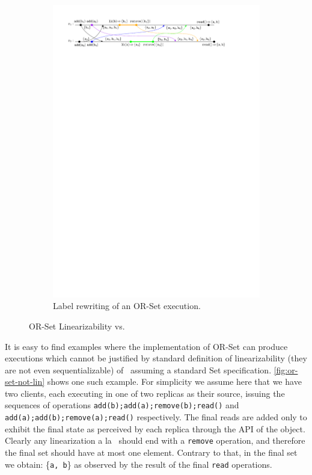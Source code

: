 \begin{figure}[t]
  \begin{subfigure}{1.0\linewidth}
    \centering
    \includegraphics[width=0.95 \textwidth]{./figures/OR-Set-lk-rem}
    \caption{Label rewriting of an OR-Set execution.}
    \label{fig:or-set-lk-rem}
  \end{subfigure}
  \caption{OR-Set Linearizability vs. \CRDTLinshort{}}
\end{figure}

It is easy to find examples where the implementation of OR-Set can
produce executions which cannot be justified by standard definition of
linearizability (they are not even sequentializable)
of~\citet{HerlihyW90} assuming a standard Set specification.
%
\autoref{fig:or-set-not-lin} shows one such example.
%
For simplicity we assume here that we have two clients, each executing
in one of two replicas as their source, issuing the sequences of
operations \lstinline|add(b);add(a);remove(b);read()| and
\lstinline|add(a);add(b);remove(a);read()| respectively.
%
The final reads are added only to exhibit the final state as perceived by
each replica through the API of the object.
%
Clearly any linearization a la~\citet{HerlihyW90} should end with a
\lstinline|remove| operation, and therefore the final set should have
at most one element. Contrary to that, in the final set we obtain:
\{\lstinline|a, b|\} as observed by the result of the final
\lstinline|read| operations.
%


